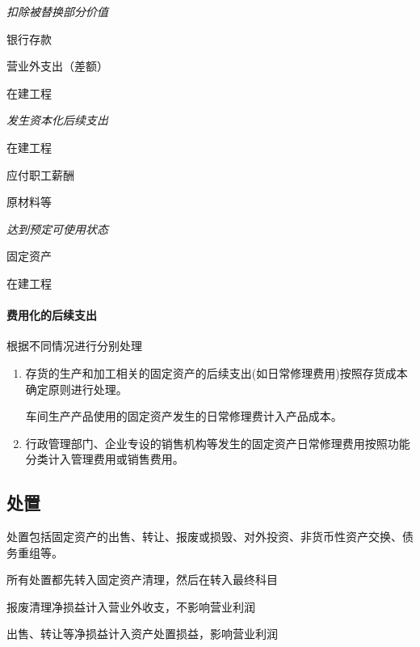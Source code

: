\documentclass[UTF8,12pt]{ctexart}
\newenvironment{Dr}{%
	\begin{list}{}%
		{
			\setlength{\leftmargin}{2em}
			\setlength{\labelwidth}{2em}
			\setlength{\labelsep}{0pt}
			\setlength{\itemindent}{0pt}
			\setlength{\listparindent}{0pt}
			\setlength{\parsep}{0pt}
			\setlength{\topsep}{0pt}
		}
		\item[\textbf{借：}]
	}{%
	\end{list}
}
\newenvironment{Cr}{%
	\begin{list}{}%
		{
			\setlength{\leftmargin}{3em}
			\setlength{\labelwidth}{2em}
			\setlength{\labelsep}{0pt}
			\setlength{\itemindent}{0pt}
			\setlength{\listparindent}{0pt}
			\setlength{\parsep}{0pt}
			\setlength{\topsep}{0pt}
		}
		\item[\textbf{贷：}]
	}{%
	\end{list}
}
\numberwithin{equation}{section} %
\numberwithin{figure}{section}
\numberwithin{table}{section}
\begin{document}
	\textit{扣除被替换部分价值}
	
	\begin{Dr}
		银行存款
		
		营业外支出（差额）
	\end{Dr}
	\begin{Cr}
		在建工程
	\end{Cr}

	
	\textit{发生资本化后续支出}
	
	\begin{Dr}
		在建工程
	\end{Dr}
	\begin{Cr}
		应付职工薪酬
		
		原材料等
	\end{Cr}
	
	\textit{达到预定可使用状态}
	
	\begin{Dr}
		固定资产
	\end{Dr}
	\begin{Cr}
		在建工程
	\end{Cr}

	
	\paragraph{费用化的后续支出}根据不同情况进行分别处理
	\begin{enumerate}
		\item 存货的生产和加工相关的固定资产的后续支出(如日常修理费用)按照存货成本确定原则进行处理。
		
		车间生产产品使用的固定资产发生的日常修理费计入产品成本。
		
		\item 行政管理部门、企业专设的销售机构等发生的固定资产日常修理费用按照功能分类计入管理费用或销售费用。
	\end{enumerate}
	
	
	
	
	
	\subsection{处置}
	
	处置包括固定资产的出售、转让、报废或损毁、对外投资、非货币性资产交换、债务重组等。
	
	所有处置都先转入固定资产清理，然后在转入最终科目
	
	报废清理净损益计入营业外收支，不影响营业利润
	
	出售、转让等净损益计入资产处置损益，影响营业利润
	
\end{document}
